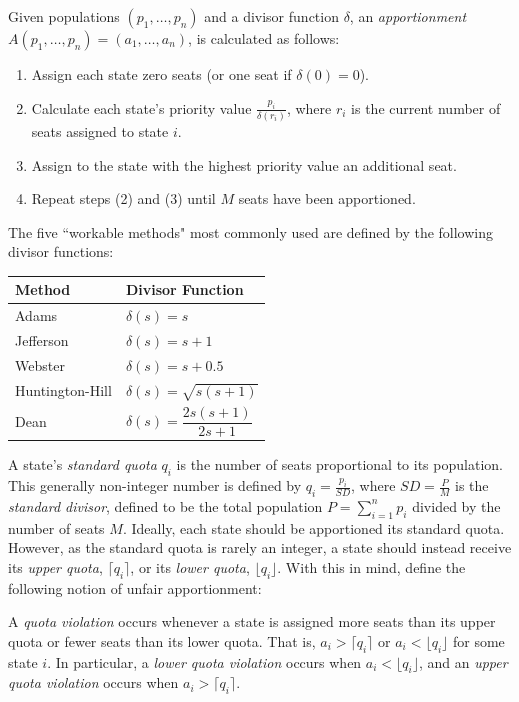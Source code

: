 \documentclass[11pt]{article}
\theoremstyle{definition}
\theoremstyle{definition}
\begin{document}
Given populations $(p_1, \dots, p_n)$ and a divisor function $\delta$, an \textit{apportionment} $A(p_1, \dots, p_n) = (a_1, \dots, a_n)$, is calculated as follows:
\begin{enumerate}
\item[\emph{1.}] Assign each state zero seats (or one seat if $\delta(0) = 0$).
\item[\emph{2.}] Calculate each state's priority value $\frac{p_i}{\delta(r_i)}$, where $r_i$ is the current number of seats assigned to state $i$. 
\item[\emph{3.}] Assign to the state with the highest priority value an additional seat.
\item[\emph{4.}] Repeat steps (2) and (3) until $M$ seats have been apportioned.
\end{enumerate}

The five ``workable methods" most commonly used are defined by the following divisor functions:
\begin{center}
\begin{tabular}{|l|l|}
 \hline
 Method & Divisor Function \\ \hline
 Adams & $\delta(s) = s$ \\
 Jefferson &$\delta(s) = s+1$\\
 Webster & $\delta(s) = s+0.5$\\
 Huntington-Hill & $\delta(s) = \sqrt{s(s+1)}$ \\
 Dean & $\delta(s) = \dfrac{2s(s+1)}{2s+1}$ \\ \hline
\end{tabular}
\end{center}

A state's \textit{standard quota} $q_i$ is the number of seats proportional to its population. This generally non-integer number is defined by $q_i = \frac{p_i}{SD}$, where $SD = \frac{P}{M}$ is the \textit{standard divisor}, defined to be the total population $P = \sum_{i=1}^n p_i$ divided by the number of seats $M$. Ideally, each state should be apportioned its standard quota. However, as the standard quota is rarely an integer, a state should instead receive its \emph{upper quota}, $\lceil q_i \rceil$, or its \emph{lower quota}, $\lfloor q_i \rfloor$. With this in mind, define the following notion of unfair apportionment:


\label{q.v._def} A \emph{quota violation} occurs whenever a state is assigned more seats than its upper quota or fewer seats than its lower quota. That is, $a_i > \lceil q_i \rceil$ or $a_i < \lfloor q_i \rfloor$ for some state $i$. In particular, a \emph{lower quota violation} occurs when $a_i < \lfloor q_i \rfloor$, and an \emph{upper quota violation} occurs when $a_i > \lceil q_i \rceil$. 
\end{document}
